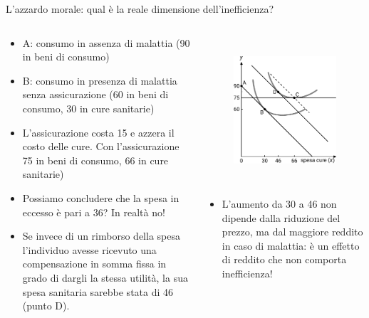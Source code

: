 \documentclass[aspectratio=64,12pt]{beamer}
\begin{document}
\begin{frame}{L'azzardo morale: qual è la reale dimensione dell'inefficienza?}
\begin{resize}{0.9}
    
\begin{columns}
\begin{column}{.5\columnwidth}
\begin{itemize}
\item A: consumo in assenza di malattia (90 in beni di consumo)
\item B: consumo in presenza di malattia senza assicurazione (60 in beni di
consumo, 30 in cure sanitarie)
\item L'assicurazione costa 15 e azzera il costo delle cure. Con l'assicurazione
75 in beni di consumo, 66 in cure sanitarie)
\item Possiamo concludere che la spesa in eccesso è pari a 36? In realtà no!
\item Se invece di un rimborso della spesa l'individuo avesse ricevuto una
compensazione in somma fissa in grado di dargli la stessa utilità, la sua
spesa sanitaria sarebbe stata di 46 (punto D).
\end{itemize}
\end{column}

\begin{column}{.5\columnwidth}
\begin{figure}[htbp]
\centering
\includegraphics[height=5.5cm]{./figure/moral-hazard-effetto-reddito.pdf}
\end{figure}
\vspace{-2mm}
\begin{itemize}
\item L'aumento da 30 a 46 non dipende dalla riduzione del prezzo, ma dal
maggiore reddito in caso di malattia: è un effetto di reddito che non comporta inefficienza!
\end{itemize}
\end{column}
\end{columns}

\end{resize}
\end{frame}
\end{document}
